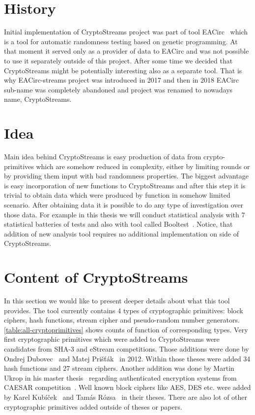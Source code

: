 \documentclass[
    digital,    %
    oneside,    %
    color,
    11pt,
    nocover,
    notable,
    nolof,
    nolot,
    final
]{fithesis3}
\begin{document}
\section{History}

Initial implementation of CryptoStreams project was part of tool EACirc~\cite{EACirc} which is a tool for automatic randomness testing based on genetic programming. At that moment it served only as a provider of data to EACirc and was not possible to use it separately outside of this project. After some time we decided that CryptoStreams might be potentially interesting also as a separate tool. That is why EACirc-streams project was introduced in 2017 and then in 2018 EACirc sub-name was completely abandoned and project was renamed to nowadays name, CryptoStreams.

\section{Idea}

Main idea behind CryptoStreams is easy production of data from crypto-primitives which are somehow reduced in complexity, either by limiting rounds or by providing them input with bad randomness properties. The biggest advantage is easy incorporation of new functions to CryptoStreams and after this step it is trivial to obtain data which were produced by function in somehow limited scenario. After obtaining data it is possible to do any type of investigation over those data. For example in this thesis we will conduct statistical analysis with 7 statistical batteries of tests and also with tool called Booltest~\cite{booltest-secrypt2017}. Notice, that addition of new analysis tool requires no additional implementation on side of CryptoStreams.

\section{Content of CryptoStreams}

In this section we would like to present deeper details about what this tool provides. The tool currently contains 4 types of cryptographic primitives: block ciphers, hash functions, stream cipher and pseudo-random number generators. \cref{table:all-cryptoprimitives}  shows counts of function of corresponding types. Very first cryptographic primitives which were added to CryptoStreams were candidates from SHA-3 and eStream competitions. Those additions were done by Ondrej Dubovec~\cite{Dubovec2012thesis} and Matej Prišťák~\cite{Pristak2012thesis} in 2012. Within those theses were added 34 hash functions and 27 stream ciphers. Another addition was done by Martin Ukrop in his master thesis~\cite{Ukrop2016thesis} regarding authenticated encryption systems from CAESAR competition~\cite{caesar-competition}. Well known block ciphers like AES, DES etc. were added by Karel Kubíček~\cite{Kubicek2017thesis} and Tamás Rózsa~\cite{Rozsa2018thesis} in their theses. There are also lot of other cryptographic primitives added outside of theses or papers.
\end{document}
